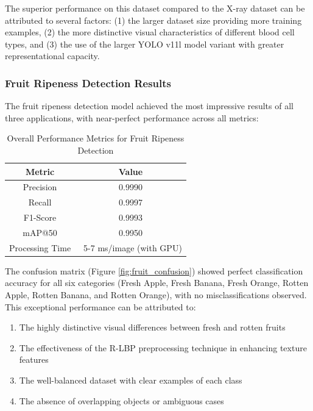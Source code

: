 \begin{multicols}{2}
The superior performance on this dataset compared to the X-ray dataset can be attributed to several factors: (1) the larger dataset size providing more training examples, (2) the more distinctive visual characteristics of different blood cell types, and (3) the use of the larger YOLO v11l model variant with greater representational capacity.

\subsubsection{Fruit Ripeness Detection Results}

The fruit ripeness detection model achieved the most impressive results of all three applications, with near-perfect performance across all metrics:

\begin{table}[h]
\centering
\begin{tabular}{|c|c|}
\hline
\textbf{Metric} & \textbf{Value} \\
\hline
Precision & 0.9990 \\
Recall & 0.9997 \\
F1-Score & 0.9993 \\
mAP@50 & 0.9950 \\
Processing Time & ~5-7 ms/image (with GPU) \\
\hline
\end{tabular}
\caption{Overall Performance Metrics for Fruit Ripeness Detection}
\label{tab:fruit_results}
\end{table}

The confusion matrix (Figure \ref{fig:fruit_confusion}) showed perfect classification accuracy for all six categories (Fresh Apple, Fresh Banana, Fresh Orange, Rotten Apple, Rotten Banana, and Rotten Orange), with no misclassifications observed. This exceptional performance can be attributed to:

\begin{enumerate}
    \item The highly distinctive visual differences between fresh and rotten fruits
    \item The effectiveness of the R-LBP preprocessing technique in enhancing texture features
    \item The well-balanced dataset with clear examples of each class
    \item The absence of overlapping objects or ambiguous cases
\end{enumerate}


\end{multicols}
